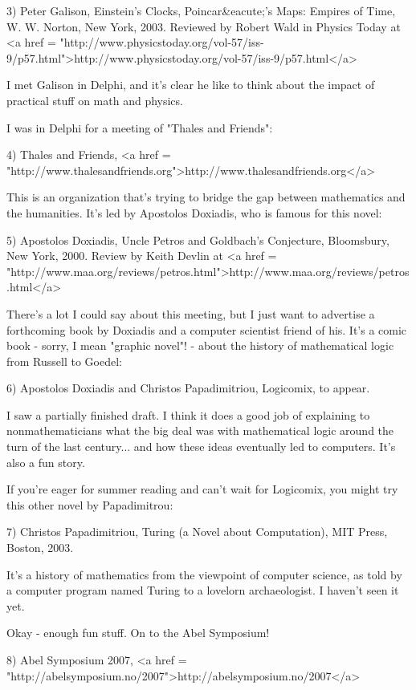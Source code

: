 3) Peter Galison, Einstein's Clocks, Poincar&eacute;'s Maps: Empires 
of Time, W. W. Norton, New York, 2003.   Reviewed by Robert Wald
in Physics Today at <a href = "http://www.physicstoday.org/vol-57/iss-9/p57.html">http://www.physicstoday.org/vol-57/iss-9/p57.html</a>

I met Galison in Delphi, and it's clear he like to think about
the impact of practical stuff on math and physics.

I was in Delphi for a meeting of "Thales and Friends":

4) Thales and Friends, <a href =
"http://www.thalesandfriends.org">http://www.thalesandfriends.org</a>

This is an organization that's trying to bridge the gap between
mathematics and the humanities.  It's led by Apostolos Doxiadis, 
who is famous for this novel:

5) Apostolos Doxiadis, Uncle Petros and Goldbach's Conjecture,
Bloomsbury, New York, 2000.  Review by Keith Devlin at <a href =
"http://www.maa.org/reviews/petros.html">http://www.maa.org/reviews/petros.html</a>

There's a lot I could say about this meeting, but I just want
to advertise a forthcoming book by Doxiadis and a computer
scientist friend of his.  It's a comic book - sorry, I mean 
"graphic novel"! - about the history of mathematical logic
from Russell to Goedel:

6) Apostolos Doxiadis and Christos Papadimitriou, Logicomix,
to appear.

I saw a partially finished draft.  I think it does a good job 
of explaining to nonmathematicians what the big deal was with 
mathematical logic around the turn of the last century... and 
how these ideas eventually led to computers.  It's also a fun 
story.  

If you're eager for summer reading and can't wait for Logicomix,
you might try this other novel by Papadimitrou:

7) Christos Papadimitriou, Turing (a Novel about Computation),
MIT Press, Boston, 2003. 

It's a history of mathematics from the viewpoint of computer 
science, as told by a computer program named Turing to a 
lovelorn archaeologist.  I haven't seen it yet.

Okay - enough fun stuff.  On to the Abel Symposium!

8) Abel Symposium 2007, <a href =
"http://abelsymposium.no/2007">http://abelsymposium.no/2007</a>

